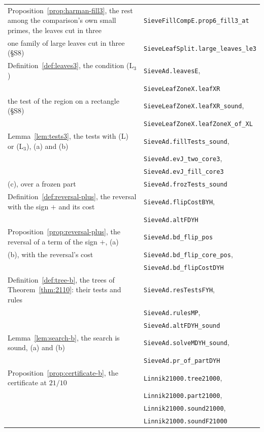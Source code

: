 \documentclass[11pt]{article}
\theoremstyle{definition}
\newcommand{\lean}[1]{\texttt{#1}}
\begin{document}
{\begin{longtable}{@{}>{\raggedright\arraybackslash}p{}l@{}}
\\
Proposition~\ref{prop:harman-fill3}, the rest among the comparison's own small primes, the leaves cut in three &
\lean{SieveFillCompE.prop6\_fill3\_at} \\
\quad one family of large leaves cut in three (\S S8) & \lean{SieveLeafSplit.large\_leaves\_le3} \\
Definition~\ref{def:leaves3}, the condition (L$_3$) & \lean{SieveAd.leavesE}, \\
 & \lean{SieveLeafZoneX.leafXR} \\
\quad the test of the region on a rectangle (\S S8) & \lean{SieveLeafZoneX.leafXR\_sound}, \\
 & \lean{SieveLeafZoneX.leafZoneX\_of\_XL} \\
Lemma~\ref{lem:tests3}, the tests with (L) or (L$_3$), (a) and (b) & \lean{SieveAd.fillTests\_sound}, \\
 & \lean{SieveAd.evJ\_two\_core3}, \\
 & \lean{SieveAd.evJ\_fill\_core3} \\
\quad (c), over a frozen part & \lean{SieveAd.frozTests\_sound} \\
Definition~\ref{def:reversal-plus}, the reversal with the sign $+$ and its cost & \lean{SieveAd.flipCostBYH}, \\
 & \lean{SieveAd.altFDYH} \\
Proposition~\ref{prop:reversal-plus}, the reversal of a term of the sign $+$, (a) & \lean{SieveAd.bd\_flip\_pos} \\
\quad (b), with the reversal's cost & \lean{SieveAd.bd\_flip\_core\_pos}, \\
 & \lean{SieveAd.bd\_flipCostDYH} \\
Definition~\ref{def:tree-b}, the trees of Theorem~\ref{thm:2110}: their tests and rules & \lean{SieveAd.resTestsFYH}, \\
 & \lean{SieveAd.rulesMP}, \\
 & \lean{SieveAd.altFDYH\_sound} \\
Lemma~\ref{lem:search-b}, the search is sound, (a) and (b) & \lean{SieveAd.solveMDYH\_sound}, \\
 & \lean{SieveAd.pr\_of\_partDYH} \\
Proposition~\ref{prop:certificate-b}, the certificate at $21/10$ & \lean{Linnik21000.tree21000}, \\
 & \lean{Linnik21000.part21000}, \\
 & \lean{Linnik21000.sound21000}, \\
 & \lean{Linnik21000.soundF21000} \\

\end{longtable}}
\end{document}
